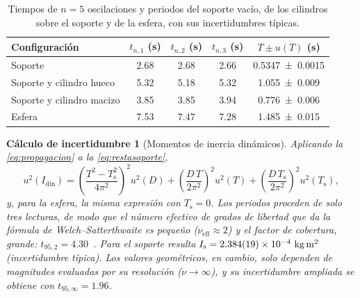 \documentclass[a4paper,11pt]{amsart}
\numberwithin{equation}{section}
\theoremstyle{cienplano}
\theoremstyle{ciendef}
\newtheorem{calculo}[proposicion]{Cálculo de incertidumbre}
\theoremstyle{cienobs}
\begin{document}
\begin{table}[ht]
\centering
\caption{Tiempos de $n=5$ oscilaciones y periodos del soporte vacío, de los
cilindros sobre el soporte y de la esfera, con sus incertidumbres típicas.}
\label{tab:tiempos_solidos}
\renewcommand{\arraystretch}{1.2}
\begin{tabular}{@{}l c c c c@{}}
\toprule
Configuración & $t_{n,1}$ (\si{\second}) & $t_{n,2}$ (\si{\second}) &
$t_{n,3}$ (\si{\second}) & $T\pm u(T)$ (\si{\second}) \\
\midrule
Soporte                     & \num{2,68} & \num{2,68} & \num{2,66} & \num{0,5347 \pm 0,0015} \\
Soporte y cilindro hueco    & \num{5,32} & \num{5,18} & \num{5,32} & \num{1,055 \pm 0,009} \\
Soporte y cilindro macizo   & \num{3,85} & \num{3,85} & \num{3,94} & \num{0,776 \pm 0,006} \\
Esfera                      & \num{7,53} & \num{7,47} & \num{7,28} & \num{1,485 \pm 0,015} \\
\bottomrule
\end{tabular}
\end{table}

\begin{calculo}[Momentos de inercia dinámicos]\label{calc:Idin}
Aplicando la \cref{eq:propagacion} a la \cref{eq:restasoporte},
\begin{equation}\label{eq:uIdin}
  u^{2}(I_{\text{din}})=\left(\frac{T^{2}-T_{\mathrm{s}}^{2}}{4\pi^{2}}\right)^{\!2}u^{2}(D)
   +\left(\frac{D\,T}{2\pi^{2}}\right)^{\!2}u^{2}(T)
   +\left(\frac{D\,T_{\mathrm{s}}}{2\pi^{2}}\right)^{\!2}u^{2}(T_{\mathrm{s}}),
\end{equation}
y, para la esfera, la misma expresión con $T_{\mathrm{s}}=0$. Los periodos
proceden de solo tres lecturas, de modo que el número efectivo de grados de
libertad que da la fórmula de Welch--Satterthwaite es pequeño
($\nu_{\mathrm{eff}}\approx2$) y el factor de cobertura, grande:
$t_{95,2}=\num{4,30}$~\cite{NUM-ARG}. Para el soporte resulta
$I_{\mathrm{s}}=\num{2,384 \pm 0,019 e-4}\ \si{\kilogram\meter\squared}$
(incertidumbre típica). Los valores geométricos, en cambio, solo dependen de
magnitudes evaluadas por su resolución ($\nu\to\infty$), y su incertidumbre
ampliada se obtiene con $t_{95,\infty}=\num{1,96}$.
\end{calculo}
\end{document}
